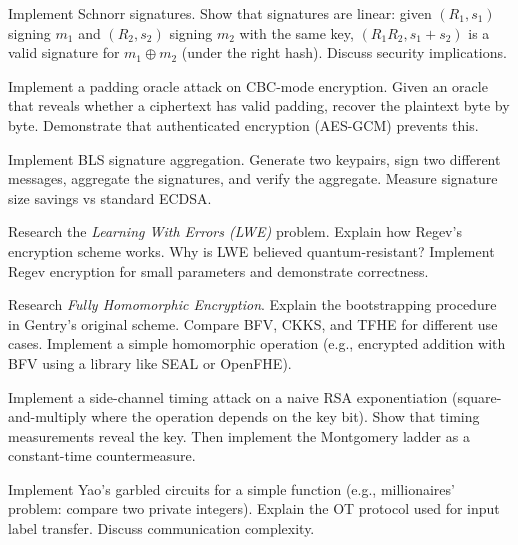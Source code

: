 \begin{exercise}[Intermediate]
Implement Schnorr signatures. Show that signatures are linear: given $(R_1, s_1)$ signing $m_1$ and $(R_2, s_2)$ signing $m_2$ with the same key, $(R_1 R_2, s_1 + s_2)$ is a valid signature for $m_1 \oplus m_2$ (under the right hash). Discuss security implications.
\end{exercise}

\begin{exercise}[Intermediate]
Implement a padding oracle attack on CBC-mode encryption. Given an oracle that reveals whether a ciphertext has valid padding, recover the plaintext byte by byte. Demonstrate that authenticated encryption (AES-GCM) prevents this.
\end{exercise}

\begin{exercise}[Intermediate]
Implement BLS signature aggregation. Generate two keypairs, sign two different messages, aggregate the signatures, and verify the aggregate. Measure signature size savings vs standard ECDSA.
\end{exercise}

\begin{exercise}[Challenge]
Research the \emph{Learning With Errors (LWE)} problem. Explain how Regev's encryption scheme works. Why is LWE believed quantum-resistant? Implement Regev encryption for small parameters and demonstrate correctness.
\end{exercise}

\begin{exercise}[Challenge]
Research \emph{Fully Homomorphic Encryption}. Explain the bootstrapping procedure in Gentry's original scheme. Compare BFV, CKKS, and TFHE for different use cases. Implement a simple homomorphic operation (e.g., encrypted addition with BFV using a library like SEAL or OpenFHE).
\end{exercise}

\begin{exercise}[Challenge]
Implement a side-channel timing attack on a naive RSA exponentiation (square-and-multiply where the operation depends on the key bit). Show that timing measurements reveal the key. Then implement the Montgomery ladder as a constant-time countermeasure.
\end{exercise}

\begin{exercise}[Challenge]
Implement Yao's garbled circuits for a simple function (e.g., millionaires' problem: compare two private integers). Explain the OT protocol used for input label transfer. Discuss communication complexity.
\end{exercise}

